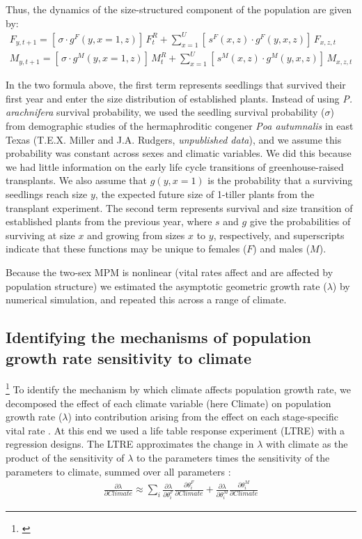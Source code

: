 \documentclass[11pt]{article}
\newcommand{\tom}[2]{{\color{red}{#1}}\footnote{\textit{\color{red}{#2}}}}
\begin{document}
Thus, the dynamics of the size-structured component of the population are given by:
\begin{align}\label{eq:dynamics}
F_{y,t+1} = [ \, \sigma \cdot g^{F}(y,x=1,z) ] \, F^{R}_{t} + \sum_{x=1}^{U} 	[ \, s^{F}(x,z) \cdot g^{F}(y,x,z)] \, F_{x,z,t}
\\
M_{y,t+1} = [ \, \sigma \cdot g^{M}(y,x=1,z) ] \, M^{R}_{t} + \sum_{x=1}^{U} 	[ \,  s^{M}(x,z) \cdot g^{M}(y,x,z) ] \, M_{x,z,t}
\end{align}

\noindent In the two formula above, the first term represents seedlings that survived their first year and enter the size distribution of established plants.
Instead of using \textit{P. arachnifera} survival probability, we used the seedling survival probability ($\sigma$) from demographic studies of the hermaphroditic congener \textit{Poa autumnalis} in east Texas (T.E.X. Miller and J.A. Rudgers, \textit{unpublished data}), and we assume this probability was constant across sexes and climatic variables. 
We did this because we had little information on the early life cycle transitions of greenhouse-raised transplants.
We also assume that $g(y,x=1)$ is the probability that a surviving seedlings reach size $y$, the expected future size of 1-tiller plants from the transplant experiment.
The second term represents survival and size transition of established plants from the previous year, where $s$ and $g$ give the probabilities of surviving at size $x$ and growing from sizes $x$ to $y$, respectively, and superscripts indicate that these functions may be unique to females ($F$) and males ($M$).

Because the two-sex MPM is nonlinear (vital rates affect and are affected by population structure) we estimated the asymptotic geometric growth rate ($\lambda$) by numerical simulation, and repeated this across a range of climate.

\subsection*{Identifying the mechanisms of population growth rate sensitivity to climate }
\tom{}{I don't think the LTRE analysis is adequately motivated by the Intro.}
To identify the mechanism by which climate affects population growth rate, we decomposed the effect of each climate variable (here Climate) on population growth rate ($\lambda$) into contribution arising from the effect on each stage-specific vital rate \citep{caswell2000matrix}.
At this end we used a life table response experiment (LTRE) with a regression designs. 
The LTRE approximates the change in $\lambda$ with climate  as the product of the sensitivity of $\lambda$ to the parameters times the sensitivity of the parameters to climate, summed over all parameters \citep{caswell1989analysis}:
\begin{align}\label{eq:ltre}
\frac{\partial \lambda}{\partial Climate} \approx \sum_{i} \frac{\partial \lambda}{\partial \theta^{F}_{i}} \frac{\partial \theta^{F}_{i}}{\partial Climate} + \frac{\partial \lambda}{\partial \theta^{M}_{i}} \frac{\partial \theta^{M}_{i}}{\partial Climate}
\end{align}
\end{document}
